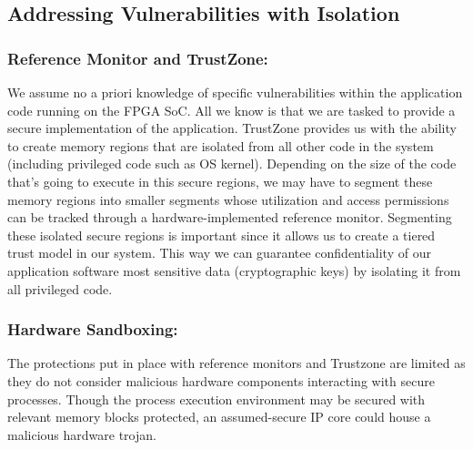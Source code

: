 \documentclass[sigconf]{acmart}
\theoremstyle{plain}
\theoremstyle{remark}
\begin{document}
\subsection{Addressing Vulnerabilities with Isolation}
\subsubsection{Reference Monitor and TrustZone:}
We assume no a priori knowledge of specific vulnerabilities within the application code running on the FPGA SoC. All we know is that we are tasked to provide a secure implementation of the application. TrustZone provides us with the ability to create memory regions that are isolated from all other code in the system (including privileged code such as OS kernel). Depending on the size of the code that's going to execute in this secure regions, we may have to segment these memory regions into smaller segments whose utilization and access permissions can be tracked through a hardware-implemented reference monitor. Segmenting these isolated secure regions is important since it allows us to create a tiered trust model in our system. This way we can guarantee confidentiality of our application software most sensitive data (cryptographic keys) by isolating it from all privileged code.


\subsubsection{Hardware Sandboxing:}
The protections put in place with reference monitors and Trustzone are limited as they do not consider malicious hardware components interacting with secure processes. Though the process execution environment may be secured with relevant memory blocks protected, an assumed-secure IP core could house a malicious hardware trojan.
\end{document}

